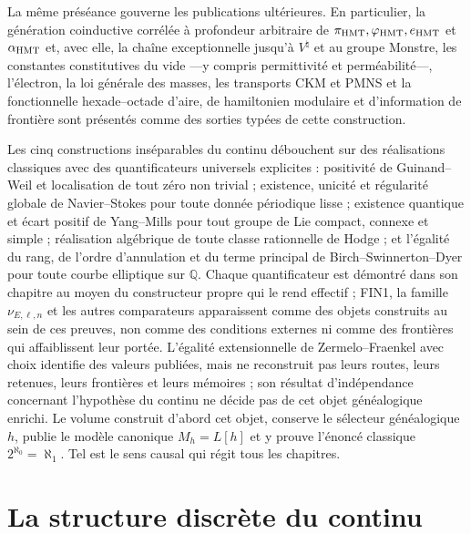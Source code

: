 La même préséance gouverne les publications ultérieures. En particulier,
la génération coinductive corrélée à profondeur arbitraire de
\(\pi_{\rm HMT},\varphi_{\rm HMT},e_{\rm HMT}\) et
\(\alpha_{\rm HMT}\)
et, avec elle, la chaîne exceptionnelle jusqu'à \(V^\natural\) et au groupe
Monstre, les constantes constitutives du vide ---y compris permittivité et
perméabilité---, l'électron, la loi générale des masses, les transports CKM et
PMNS et la fonctionnelle hexade--octade d'aire, de hamiltonien modulaire et d'information
de frontière sont présentés comme des sorties typées de cette construction.

Les cinq constructions inséparables du continu débouchent sur des réalisations
classiques avec des quantificateurs universels explicites : positivité de
Guinand--Weil et localisation de tout zéro non trivial ; existence, unicité et
régularité globale de Navier--Stokes pour toute donnée périodique lisse ; existence
quantique et écart positif de Yang--Mills pour tout groupe de Lie compact,
connexe et simple ; réalisation algébrique de toute classe rationnelle de Hodge ; et
l'égalité du rang, de l'ordre d'annulation et du terme principal de
Birch--Swinnerton--Dyer pour toute courbe elliptique sur \(\mathbb Q\). Chaque
quantificateur est démontré dans son chapitre au moyen du constructeur propre qui
le rend effectif ; FIN1, la famille \(\nu_{E,\ell,n}\) et les autres
comparateurs apparaissent comme des objets construits au sein de ces preuves, non
comme des conditions externes ni comme des frontières qui affaiblissent leur portée. L'égalité
extensionnelle de Zermelo--Fraenkel avec choix identifie des valeurs publiées,
mais ne reconstruit pas leurs routes, leurs retenues, leurs frontières et leurs mémoires ; son résultat
d'indépendance concernant l'hypothèse du continu ne décide pas de cet objet
généalogique enrichi. Le volume construit d'abord cet objet, conserve le
sélecteur généalogique \(h\), publie le modèle canonique \(M_h=L[h]\) et y prouve
l'énoncé classique \(2^{\aleph_0}=\aleph_1\). Tel est le sens
causal qui régit tous les chapitres.

\section*{La structure discrète du continu}

